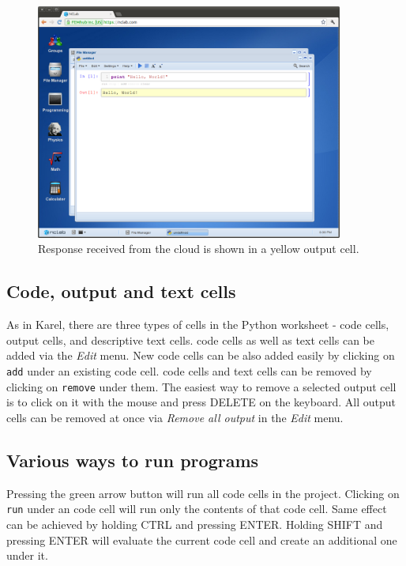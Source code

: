 \newpage

\begin{figure}[!ht]
\begin{center}
\includegraphics[width=0.9\textwidth]{imgp/python-2.png}
\end{center}
\vspace{-2mm}
\caption{Response received from the cloud is shown in a yellow output cell.}
\label{fig:python-2}
\end{figure}

\subsection{Code, output and text cells}

As in Karel, there are three types of cells in the Python worksheet - code cells, output cells, 
and descriptive text cells. code cells as well as text cells can be added via 
the {\em Edit} menu. New code cells can be also added easily by clicking on {\tt add} under
an existing code cell. code cells and text cells can be removed by clicking on 
{\tt remove} under them. The easiest way to remove a selected output cell is to 
click on it with the mouse and press DELETE on the keyboard. 
All output cells can be removed at once via {\em Remove all output} in the {\em Edit} menu. 

\subsection{Various ways to run programs}

Pressing the green arrow button will run all code cells in the project. Clicking 
on {\tt run} under an code cell will run only the contents of that code cell. 
Same effect can be achieved by holding CTRL and pressing ENTER. Holding SHIFT
and pressing ENTER will evaluate the current code cell and create an additional one
under it.

